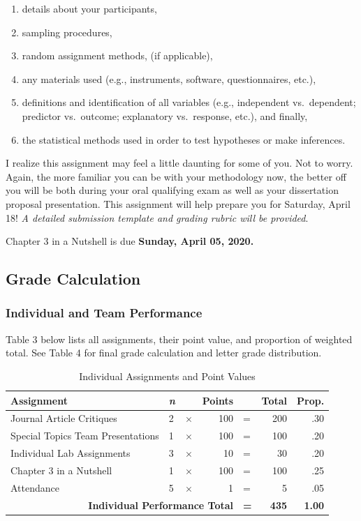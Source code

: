 \documentclass[
]{article}
\providecommand{\tightlist}{%
  \setlength{\itemsep}{0pt}\setlength{\parskip}{0pt}}
\begin{document}
\begin{enumerate}
\def\labelenumi{\arabic{enumi}.}
\tightlist
\item
  details about your participants,
\item
  sampling procedures,
\item
  random assignment methods, (if applicable),
\item
  any materials used (e.g., instruments, software, questionnaires,
  etc.),
\item
  definitions and identification of all variables (e.g., independent
  vs.~dependent; predictor vs.~outcome; explanatory vs.~response, etc.),
  and finally,
\item
  the statistical methods used in order to test hypotheses or make
  inferences.
\end{enumerate}

I realize this assignment may feel a little daunting for some of you.
Not to worry. Again, the more familiar you can be with your methodology
now, the better off you will be both during your oral qualifying exam as
well as your dissertation proposal presentation. This assignment will
help prepare you for Saturday, April 18! \emph{A detailed submission
template and grading rubric will be provided}.

Chapter 3 in a Nutshell is due \textbf{Sunday, April 05, 2020.}

\subsection{Grade Calculation}

\subsubsection{Individual and Team Performance}

Table 3 below lists all assignments, their point value, and proportion
of weighted total. See Table 4 for final grade calculation and letter
grade distribution.

\begin{table}[H]
\centering
\caption{Individual Assignments and Point Values}
\vspace{3mm}
\label{points}
\begin{tabular}{lllrlrr}
\hline
\bf{Assignment} & \bf{\em{n}} &  & \bf{Points} &  & \bf{Total} & \bf{Prop.} \\
\hline
Journal Article Critiques & 2 & $\times$ & 100 & = & 200 & .30\\
Special Topics Team Presentations & 1 & $\times$ & 100 & = & 100 & .20\\
Individual Lab Assignments & 3 & $\times$ & 10 & = & 30 & .20 \\
Chapter 3 in a Nutshell & 1 & $\times$ & 100 & = & 100 & .25 \\
Attendance & 5 & $\times$ & 1 & = & 5 & .05 \\
\multicolumn{4}{r}{\bf{Individual Performance Total}} & {\bf{=}} & {\bf{435}} & {\bf{1.00}} \\
\hline
\end{tabular}
\label{points}
\end{table}
\end{document}

